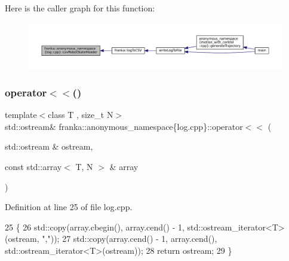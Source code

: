 Here is the caller graph for this function\+:
\nopagebreak
\begin{figure}[H]
\begin{center}
\leavevmode
\includegraphics[width=350pt]{namespacefranka_1_1anonymous__namespace_02log_8cpp_03_a6de657d62964bab6ee389fd7be7b639f_icgraph}
\end{center}
\end{figure}
\mbox{\label{namespacefranka_1_1anonymous__namespace_02log_8cpp_03_a178381c1399ef1dfce8a148f3c336b43}} 
\subsubsection{\texorpdfstring{operator$<$$<$()}{operator<<()}}
{\footnotesize\ttfamily template$<$class T , size\+\_\+t N$>$ \\
std\+::ostream\& franka\+::anonymous\+\_\+namespace\{log.\+cpp\}\+::operator$<$$<$ (\begin{DoxyParamCaption}\item[{std\+::ostream \&}]{ostream,  }\item[{const std\+::array$<$ T, N $>$ \&}]{array }\end{DoxyParamCaption})}



Definition at line 25 of file log.\+cpp.


\begin{DoxyCode}
25                                                                            \{
26   std::copy(array.cbegin(), array.cend() - 1, std::ostream\_iterator<T>(ostream, \textcolor{stringliteral}{","}));
27   std::copy(array.cend() - 1, array.cend(), std::ostream\_iterator<T>(ostream));
28   \textcolor{keywordflow}{return} ostream;
29 \}
\end{DoxyCode}
